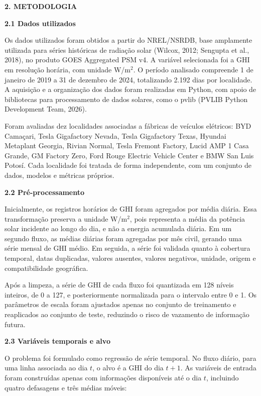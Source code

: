 \documentclass[12pt,a4paper]{article}
\begin{document}
\noindent\textbf{2. METODOLOGIA}

\vspace{12pt}

\noindent\textbf{2.1 Dados utilizados}

Os dados utilizados foram obtidos a partir do NREL/NSRDB, base amplamente utilizada para séries históricas de radiação solar (Wilcox, 2012; Sengupta et al., 2018), no produto GOES Aggregated PSM v4. A variável selecionada foi a GHI em resolução horária, com unidade W/m$^2$. O período analisado compreende 1 de janeiro de 2019 a 31 de dezembro de 2024, totalizando 2.192 dias por localidade. A aquisição e a organização dos dados foram realizadas em Python, com apoio de bibliotecas para processamento de dados solares, como o pvlib (PVLIB Python Development Team, 2026).

Foram avaliadas dez localidades associadas a fábricas de veículos elétricos: BYD Camaçari, Tesla Gigafactory Nevada, Tesla Gigafactory Texas, Hyundai Metaplant Georgia, Rivian Normal, Tesla Fremont Factory, Lucid AMP 1 Casa Grande, GM Factory Zero, Ford Rouge Electric Vehicle Center e BMW San Luis Potosí. Cada localidade foi tratada de forma independente, com um conjunto de dados, modelos e métricas próprios.

\vspace{12pt}

\noindent\textbf{2.2 Pré-processamento}

Inicialmente, os registros horários de GHI foram agregados por média diária. Essa transformação preserva a unidade W/m$^2$, pois representa a média da potência solar incidente ao longo do dia, e não a energia acumulada diária. Em um segundo fluxo, as médias diárias foram agregadas por mês civil, gerando uma série mensal de GHI médio. Em seguida, a série foi validada quanto à cobertura temporal, datas duplicadas, valores ausentes, valores negativos, unidade, origem e compatibilidade geográfica.

Após a limpeza, a série de GHI de cada fluxo foi quantizada em 128 níveis inteiros, de 0 a 127, e posteriormente normalizada para o intervalo entre 0 e 1. Os parâmetros de escala foram ajustados apenas no conjunto de treinamento e reaplicados ao conjunto de teste, reduzindo o risco de vazamento de informação futura.

\vspace{12pt}

\noindent\textbf{2.3 Variáveis temporais e alvo}

O problema foi formulado como regressão de série temporal. No fluxo diário, para uma linha associada ao dia $t$, o alvo é a GHI do dia $t+1$. As variáveis de entrada foram construídas apenas com informações disponíveis até o dia $t$, incluindo quatro defasagens e três médias móveis:
\end{document}

